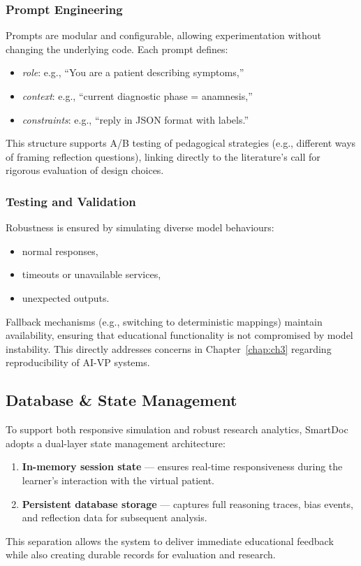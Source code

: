 \subsubsection{Prompt Engineering}
Prompts are modular and configurable, allowing experimentation without changing
the underlying code. Each prompt defines:
\begin{itemize}
    \item \emph{role}: e.g., “You are a patient describing symptoms,”
    \item \emph{context}: e.g., “current diagnostic phase = anamnesis,”
    \item \emph{constraints}: e.g., “reply in JSON format with labels.”
\end{itemize}
This structure supports A/B testing of pedagogical strategies (e.g., different
ways of framing reflection questions), linking directly to the literature’s call
for rigorous evaluation of design choices.

\subsubsection{Testing and Validation}
Robustness is ensured by simulating diverse model behaviours:
\begin{itemize}
    \item normal responses,
    \item timeouts or unavailable services,
    \item unexpected outputs.
\end{itemize}
Fallback mechanisms (e.g., switching to deterministic mappings) maintain
availability, ensuring that educational functionality is not compromised by
model instability. This directly addresses concerns in Chapter~\ref{chap:ch3}
regarding reproducibility of AI-VP systems.


\subsection{Database \& State Management}
\label{sec:db_state}

To support both responsive simulation and robust research analytics, SmartDoc
adopts a dual-layer state management architecture:
\begin{enumerate}
    \item \textbf{In-memory session state} --- ensures real-time responsiveness during the
    learner’s interaction with the virtual patient.
    \item \textbf{Persistent database storage} --- captures full reasoning traces,
    bias events, and reflection data for subsequent analysis.
\end{enumerate}
This separation allows the system to deliver immediate educational feedback while also
creating durable records for evaluation and research.

